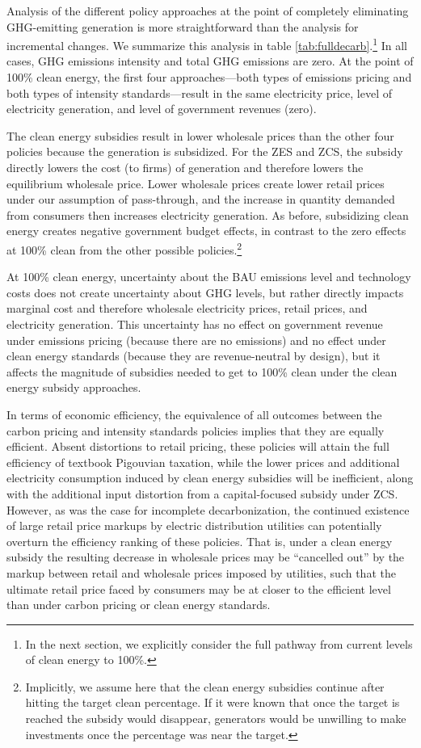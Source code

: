 \documentclass[12pt]{article}
\begin{document}
Analysis of the different policy approaches at the point of completely eliminating GHG-emitting generation is more straightforward than the analysis for incremental changes. We summarize this analysis in table \ref{tab:fulldecarb}.\footnote{In the next section, we explicitly consider the full pathway from current levels of clean energy to 100\%.} In all cases, GHG emissions intensity and total GHG emissions are zero. At the point of 100\% clean energy, the first four approaches---both types of emissions pricing and both types of intensity standards---result in the same electricity price, level of electricity generation, and level of government revenues (zero). 

The clean energy subsidies result in lower wholesale prices than the other four policies because the generation is subsidized.  For the ZES and ZCS, the subsidy directly lowers the cost (to firms) of generation and therefore lowers the equilibrium wholesale price. Lower wholesale prices create lower retail prices under our assumption of pass-through, and the increase in quantity demanded from consumers then increases electricity generation. As before, subsidizing clean energy creates negative government budget effects, in contrast to the zero effects at 100\% clean from the other possible policies.\footnote{Implicitly, we assume here that the clean energy subsidies continue after hitting the target clean percentage. If it were known that once the target is reached the subsidy would disappear, generators would be unwilling to make investments once the percentage was near the target.}

At 100\% clean energy, uncertainty about the BAU emissions level and technology costs does not create uncertainty about GHG levels, but rather directly impacts marginal cost and therefore wholesale electricity prices, retail prices, and electricity generation. This uncertainty has no effect on government revenue under  emissions pricing (because there are no emissions) and no effect under clean energy standards (because they are revenue-neutral by design), but it affects the magnitude of subsidies needed to get to 100\% clean under the clean energy subsidy approaches.

In terms of economic efficiency, the equivalence of all outcomes between the carbon pricing and intensity standards policies implies that they are equally efficient. Absent distortions to retail pricing, these policies will attain the full efficiency of textbook Pigouvian taxation, while the lower prices and additional electricity consumption induced by clean energy subsidies will be inefficient, along with the additional input distortion from a capital-focused subsidy under ZCS. However, as was the case for incomplete decarbonization, the continued existence of large retail price markups by electric distribution utilities can potentially overturn the efficiency ranking of these policies. That is, under a clean energy subsidy the resulting decrease in wholesale prices may be ``cancelled out'' by the markup between retail and wholesale prices imposed by utilities, such that the ultimate retail price faced by consumers may be at closer to the efficient level than under carbon pricing or clean energy standards. 
\end{document}
